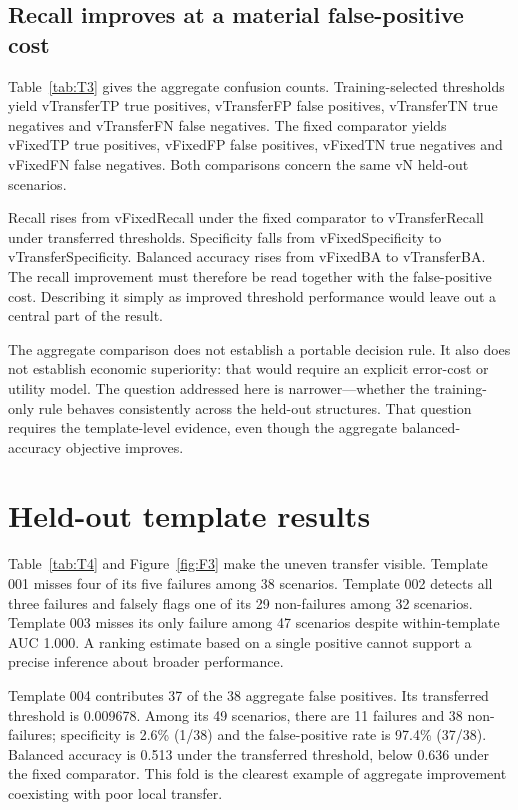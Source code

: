 \documentclass[11pt,a4paper]{article}
\newcommand{\exhibit}[1]{}
\newcommand{\val}[1]{\csname v#1\endcsname}
\begin{document}
\subsection{Recall improves at a material false-positive cost}
Table~\ref{tab:T3} gives the aggregate confusion counts. Training-selected thresholds yield \val{TransferTP} true positives, \val{TransferFP} false positives, \val{TransferTN} true negatives and \val{TransferFN} false negatives. The fixed comparator yields \val{FixedTP} true positives, \val{FixedFP} false positives, \val{FixedTN} true negatives and \val{FixedFN} false negatives. Both comparisons concern the same \val{N} held-out scenarios.

Recall rises from \val{FixedRecall} under the fixed comparator to \val{TransferRecall} under transferred thresholds. Specificity falls from \val{FixedSpecificity} to \val{TransferSpecificity}. Balanced accuracy rises from \val{FixedBA} to \val{TransferBA}. The recall improvement must therefore be read together with the false-positive cost. Describing it simply as improved threshold performance would leave out a central part of the result.
\exhibit{T3}

The aggregate comparison does not establish a portable decision rule. It also does not establish economic superiority: that would require an explicit error-cost or utility model. The question addressed here is narrower---whether the training-only rule behaves consistently across the held-out structures. That question requires the template-level evidence, even though the aggregate balanced-accuracy objective improves.

\section{Held-out template results}
Table~\ref{tab:T4} and Figure~\ref{fig:F3} make the uneven transfer visible. Template 001 misses four of its five failures among 38 scenarios. Template 002 detects all three failures and falsely flags one of its 29 non-failures among 32 scenarios. Template 003 misses its only failure among 47 scenarios despite within-template AUC 1.000. A ranking estimate based on a single positive cannot support a precise inference about broader performance.

Template 004 contributes 37 of the 38 aggregate false positives. Its transferred threshold is 0.009678. Among its 49 scenarios, there are 11 failures and 38 non-failures; specificity is 2.6\% (1/38) and the false-positive rate is 97.4\% (37/38). Balanced accuracy is 0.513 under the transferred threshold, below 0.636 under the fixed comparator. This fold is the clearest example of aggregate improvement coexisting with poor local transfer.
\end{document}
